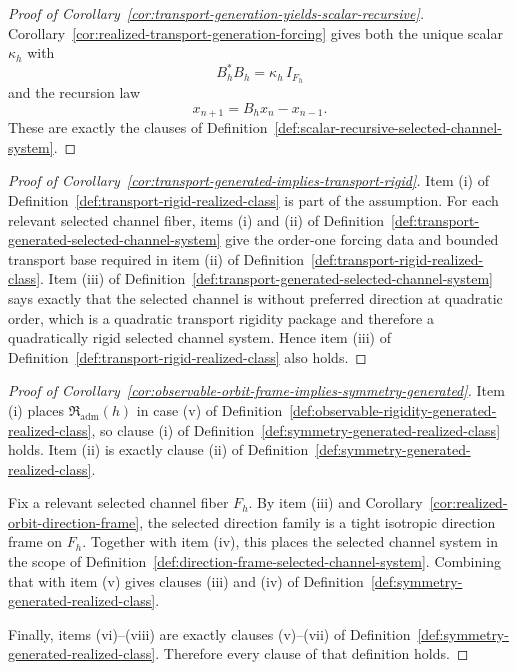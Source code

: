 \begin{proof}[Proof of Corollary~\ref{cor:transport-generation-yields-scalar-recursive}]
\label{proof:cor:transport-generation-yields-scalar-recursive}
Corollary~\ref{cor:realized-transport-generation-forcing} gives both the unique
scalar $\kappa_h$ with
\[
B_h^*B_h=\kappa_h\,I_{F_h}
\]
and the recursion law
\[
x_{n+1}=B_hx_n-x_{n-1}.
\]
These are exactly the clauses of
Definition~\ref{def:scalar-recursive-selected-channel-system}.
\end{proof}

\begin{proof}[Proof of Corollary~\ref{cor:transport-generated-implies-transport-rigid}]
\label{proof:cor:transport-generated-implies-transport-rigid}
Item (i) of Definition~\ref{def:transport-rigid-realized-class} is part of the
assumption. For each relevant selected channel fiber, items (i) and (ii) of
Definition~\ref{def:transport-generated-selected-channel-system} give the
order-one forcing data and bounded transport base required in item (ii) of
Definition~\ref{def:transport-rigid-realized-class}. Item (iii) of
Definition~\ref{def:transport-generated-selected-channel-system} says exactly
that the selected channel is without preferred direction at quadratic order,
which is a quadratic transport rigidity package and therefore a quadratically
rigid selected channel system. Hence item (iii) of
Definition~\ref{def:transport-rigid-realized-class} also holds.
\end{proof}

\begin{proof}[Proof of Corollary~\ref{cor:observable-orbit-frame-implies-symmetry-generated}]
\label{proof:cor:observable-orbit-frame-implies-symmetry-generated}
Item (i) places $\mathfrak R_{\mathrm{adm}}(h)$ in case (v) of
Definition~\ref{def:observable-rigidity-generated-realized-class}, so clause
(i) of Definition~\ref{def:symmetry-generated-realized-class} holds. Item
(ii) is exactly clause (ii) of
Definition~\ref{def:symmetry-generated-realized-class}.

Fix a relevant selected channel fiber $F_h$. By item (iii) and
Corollary~\ref{cor:realized-orbit-direction-frame}, the selected direction
family is a tight isotropic direction frame on $F_h$. Together with item (iv),
this places the selected channel system in the scope of
Definition~\ref{def:direction-frame-selected-channel-system}. Combining that
with item (v) gives clauses (iii) and (iv) of
Definition~\ref{def:symmetry-generated-realized-class}.

Finally, items (vi)--(viii) are exactly clauses (v)--(vii) of
Definition~\ref{def:symmetry-generated-realized-class}. Therefore every clause
of that definition holds.
\end{proof}

